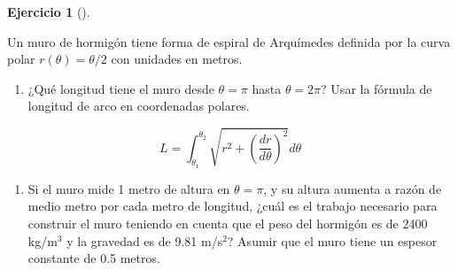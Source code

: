 \documentclass[
  spanish,
  a4paper,
]{scrreport}
\providecommand{\tightlist}{%
  \setlength{\itemsep}{0pt}\setlength{\parskip}{0pt}}
\theoremstyle{definition}
\newtheorem{exercise}{Ejercicio}[chapter]
\theoremstyle{remark}
\begin{document}
\begin{exercise}[]\protect\hypertarget{exr-2}{}\label{exr-2}

Un muro de hormigón tiene forma de espiral de Arquímedes definida por la
curva polar \(r(\theta) = \theta/2\) con unidades en metros.

\begin{enumerate}
\def\labelenumi{\alph{enumi}.}
\tightlist
\item
  ¿Qué longitud tiene el muro desde \(\theta = \pi\) hasta
  \(\theta = 2\pi\)? Usar la fórmula de longitud de arco en coordenadas
  polares.
\end{enumerate}

\[
L = \int_{\theta_1}^{\theta_2} \sqrt{r^2 + \left(\frac{dr}{d\theta}\right)^2} d\theta
\]

\begin{enumerate}
\def\labelenumi{\alph{enumi}.}
\tightlist
\item
  Si el muro mide 1 metro de altura en \(\theta = \pi\), y su altura
  aumenta a razón de medio metro por cada metro de longitud, ¿cuál es el
  trabajo necesario para construir el muro teniendo en cuenta que el
  peso del hormigón es de 2400 kg/m\(^3\) y la gravedad es de 9.81
  m/s\(^2\)? Asumir que el muro tiene un espesor constante de 0.5
  metros.
\end{enumerate}

\end{exercise}
\end{document}
